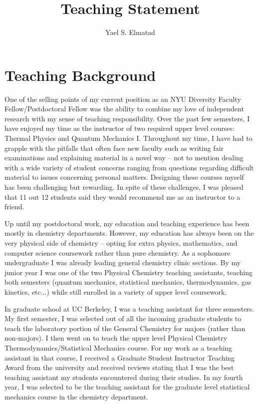 \documentclass[11pt]{article}
\title{{Teaching Statement}}
\author{Yael S. Elmatad}
\date{}                                           %
\begin{document}
\maketitle
%

\section{Teaching Background}

One of the selling points of my current position as an NYU Diversity Faculty Fellow/Postdoctoral Fellow was the ability to combine my love of independent research with my sense of teaching responsibility.  Over the past few semesters, I have enjoyed my time as the instructor of two required upper level courses: Thermal Physics and Quantum Mechanics I.  Throughout my time, I have had to grapple with the pitfalls that often face new faculty such as writing fair examinations and explaining material in a novel way -- not to mention dealing with a wide variety of student concerns ranging from questions regarding difficult material to issues concerning personal matters.  Designing these courses myself has been challenging but rewarding.  In spite of these challenges, I was pleased that 11 out 12 students said they would recommend me as an instructor to a friend. 

Up until my postdoctoral work, my education and teaching experience has been mostly in chemistry departments.  However, my education has always been on the very physical side of chemistry -- opting for extra physics, mathematics, and computer science coursework rather than pure chemistry.  As a sophomore undergraduate I was already leading general chemistry clinic sections.  By my junior year I was one of the two Physical Chemistry teaching assistants, teaching both semesters (quantum mechanics, statistical mechanics, thermodynamics, gas kinetics, etc...) while still enrolled in a variety of upper level coursework.

In graduate school at UC Berkeley, I was a teaching assistant for three semesters.  My first semester, I was selected out of all the incoming graduate students to teach the laboratory portion of the General Chemistry for majors (rather than non-majors). I then went on to teach the upper level Physical Chemistry Thermodynamics/Statistical Mechanics course.  For my work as a teaching assistant in that course, I received a Graduate Student Instructor Teaching Award from the university and received reviews stating that I was the best teaching assistant my students encountered during their studies.  In my fourth year, I was selected to be the teaching assistant for the graduate level statistical mechanics course in the chemistry department.
\end{document}
